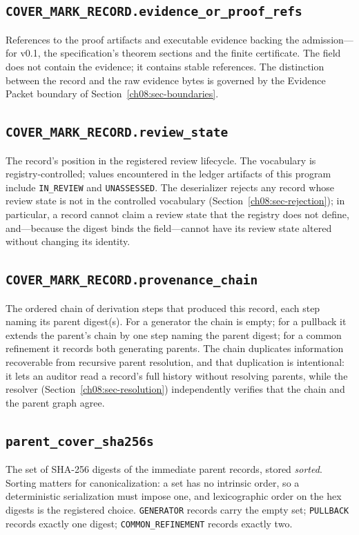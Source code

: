 \subsection{\texttt{COVER\_MARK\_RECORD.evidence\_or\_proof\_refs}}
References to the proof artifacts and executable evidence backing the admission---for v0.1, the specification's theorem sections and the finite certificate. The field does not contain the evidence; it contains stable references. The distinction between the record and the raw evidence bytes is governed by the Evidence Packet boundary of Section~\ref{ch08:sec-boundaries}.

\subsection{\texttt{COVER\_MARK\_RECORD.review\_state}}
The record's position in the registered review lifecycle. The vocabulary is registry-controlled; values encountered in the ledger artifacts of this program include \texttt{IN\_REVIEW} and \texttt{UNASSESSED}. The deserializer rejects any record whose review state is not in the controlled vocabulary (Section~\ref{ch08:sec-rejection}); in particular, a record cannot claim a review state that the registry does not define, and---because the digest binds the field---cannot have its review state altered without changing its identity.

\subsection{\texttt{COVER\_MARK\_RECORD.provenance\_chain}}
The ordered chain of derivation steps that produced this record, each step naming its parent digest(s). For a generator the chain is empty; for a pullback it extends the parent's chain by one step naming the parent digest; for a common refinement it records both generating parents. The chain duplicates information recoverable from recursive parent resolution, and that duplication is intentional: it lets an auditor read a record's full history without resolving parents, while the resolver (Section~\ref{ch08:sec-resolution}) independently verifies that the chain and the parent graph agree.

\subsection{\texttt{parent\_cover\_sha256s}}
The set of SHA-256 digests of the immediate parent records, stored \emph{sorted}. Sorting matters for canonicalization: a set has no intrinsic order, so a deterministic serialization must impose one, and lexicographic order on the hex digests is the registered choice. \texttt{GENERATOR} records carry the empty set; \texttt{PULLBACK} records exactly one digest; \texttt{COMMON\_REFINEMENT} records exactly two.

